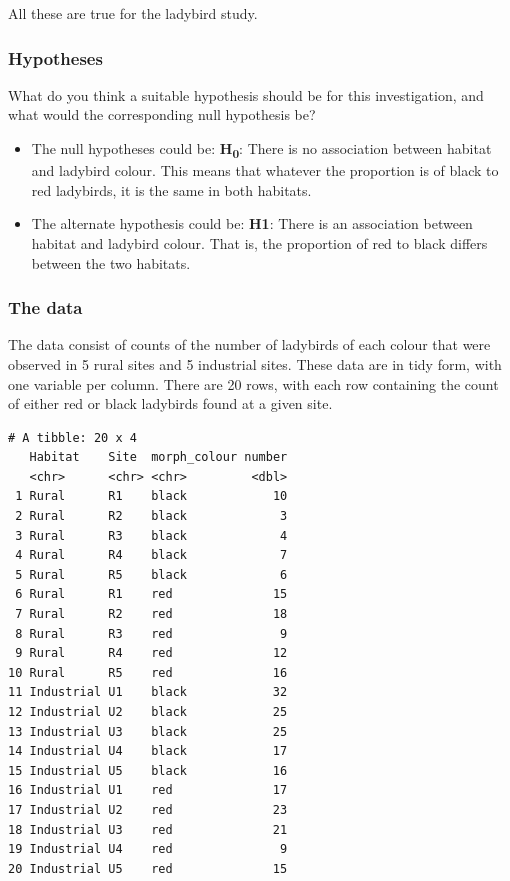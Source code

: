 \documentclass[
  letterpaper,
  DIV=11,
  numbers=noendperiod]{scrreprt}
\providecommand{\tightlist}{%
  \setlength{\itemsep}{0pt}\setlength{\parskip}{0pt}}\usepackage{longtable,booktabs,array}
\begin{document}
All these are true for the ladybird study.

\subsubsection{Hypotheses}\label{hypotheses}

What do you think a suitable hypothesis should be for this
investigation, and what would the corresponding null hypothesis be?

\begin{itemize}
\tightlist
\item
  The null hypotheses could be: \textbf{H\textsubscript{0}}: There is no
  association between habitat and ladybird colour. This means that
  whatever the proportion is of black to red ladybirds, it is the same
  in both habitats.\\
\item
  The alternate hypothesis could be: \textbf{H1}: There is an
  association between habitat and ladybird colour. That is, the
  proportion of red to black differs between the two habitats.
\end{itemize}

\subsubsection{The data}\label{the-data-1}

The data consist of counts of the number of ladybirds of each colour
that were observed in 5 rural sites and 5 industrial sites. These data
are in tidy form, with one variable per column. There are 20 rows, with
each row containing the count of either red or black ladybirds found at
a given site.

\begin{verbatim}
# A tibble: 20 x 4
   Habitat    Site  morph_colour number
   <chr>      <chr> <chr>         <dbl>
 1 Rural      R1    black            10
 2 Rural      R2    black             3
 3 Rural      R3    black             4
 4 Rural      R4    black             7
 5 Rural      R5    black             6
 6 Rural      R1    red              15
 7 Rural      R2    red              18
 8 Rural      R3    red               9
 9 Rural      R4    red              12
10 Rural      R5    red              16
11 Industrial U1    black            32
12 Industrial U2    black            25
13 Industrial U3    black            25
14 Industrial U4    black            17
15 Industrial U5    black            16
16 Industrial U1    red              17
17 Industrial U2    red              23
18 Industrial U3    red              21
19 Industrial U4    red               9
20 Industrial U5    red              15
\end{verbatim}
\end{document}
